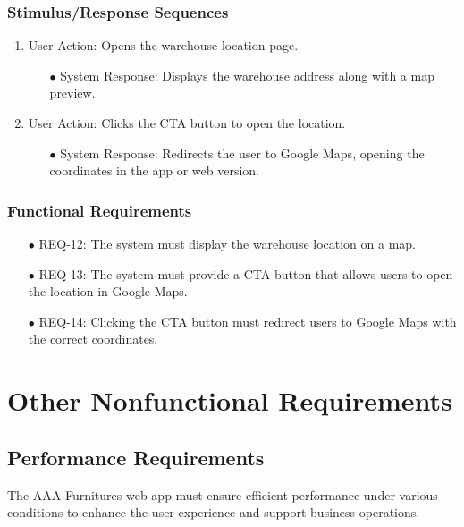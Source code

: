\documentclass[oneside,a4paper,12pt,explicit]{book}
\begin{document}
\subsection{Stimulus/Response Sequences}
\begin{enumerate}
    \item User Action: Opens the warehouse location page.
    \begin{enumerate}
        \item[$\bullet$] System Response: Displays the warehouse address along with a map preview.
    \end{enumerate}
    \item User Action: Clicks the CTA button to open the location.
    \begin{enumerate}
        \item[$\bullet$] System Response: Redirects the user to Google Maps, opening the coordinates in the app or web version.
    \end{enumerate}
\end{enumerate}

\subsection{Functional Requirements}
\begin{enumerate}
    \item[$\bullet$] REQ-12: The system must display the warehouse location on a map.
    \item[$\bullet$] REQ-13: The system must provide a CTA button that allows users to open the location in Google Maps.
    \item[$\bullet$] REQ-14: Clicking the CTA button must redirect users to Google Maps with the correct coordinates.
\end{enumerate}



\chapter{Other Nonfunctional Requirements}

\section{Performance Requirements}

The AAA Furnitures web app must ensure efficient performance under various conditions to enhance the user experience and support business operations.
\end{document}
